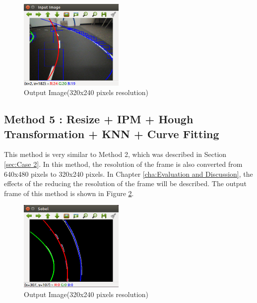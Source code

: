 \begin{figure}[H]
  \centering
  \includegraphics[width=0.45\textwidth]{./Bilder/Case4_OutputImage.png}
  \caption{Output Image(320x240 pixels resolution)}
  \label{fig:Case4_OutputImage}
\end{figure}




\subsection{Method 5 : Resize + IPM + Hough Transformation + KNN + Curve Fitting}\label{sec:Case 5}

This method is very similar to Method 2, which was described in Section \ref{sec:Case 2}. In this method, the resolution of the frame is also converted from 640x480 pixels to 320x240 pixels. In Chapter \ref{cha:Evaluation and Discussion}, the effects of the reducing the resolution of the frame will be described. The output frame of this method is shown in Figure \ref{fig:Case5_OutputImage}.


\begin{figure}[H]
  \centering
  \includegraphics[width=0.45\textwidth]{./Bilder/Case5_OutputImage.png}
  \caption{Output Image(320x240 pixels resolution)}
  \label{fig:Case5_OutputImage}
\end{figure}






%


